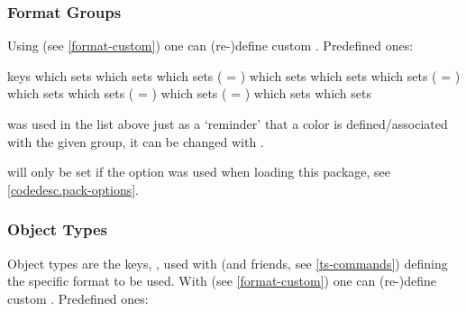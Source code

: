 \documentclass{article}
\begin{document}
\subsubsection{Format Groups}\label{format-group}
Using  (see \ref{format-custom}) one can (re-)define custom . Predefined ones:
\begin{describelist*}{keys}
   {which sets }
   {which sets }
   {which sets  ( = \tsobj{\indexfmtcsraw})}
   {which sets }
   {which sets }
    {which sets  ( = \tsobj{\indexfmtraw})}
    {which sets }
   {which sets  ( = \tsobj{\indexfmtraw})}
   {which sets  ( = \tsobj{\indexfmtraw})}
   {which sets }
   {which sets }
\end{describelist*}
\begin{tsremark}
 was used in the list above just as a `reminder' that a color is defined/associated with the given group, it can be changed with .
\end{tsremark}
\begin{tsremark}
 will only be set if the option  was used when loading this package, see \ref{codedesc.pack-options}.
\end{tsremark}

\subsubsection{Object Types}\label{obj-types}
Object types are the keys, ,  used with \tsobj{\tsobj} (and friends, see \ref{ts-commands}) defining the specific format to be used.
With  (see \ref{format-custom}) one can (re-)define custom . 
Predefined ones:
\end{document}
